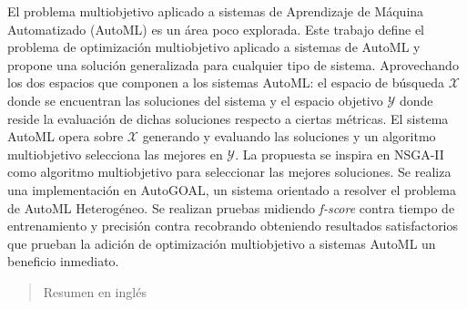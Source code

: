 \begin{resumen}
	El problema multiobjetivo aplicado a sistemas de Aprendizaje de M\'aquina Automatizado (AutoML) es un \'area poco explorada. Este trabajo define el problema de optimizaci\'on multiobjetivo aplicado a sistemas de AutoML y propone una soluci\'on generalizada para cualquier tipo de sistema.
    Aprovechando los dos espacios que componen a los sistemas AutoML: el espacio de b\'usqueda $\mathcal{X}$ donde se encuentran las soluciones del sistema y el espacio objetivo $\mathcal{Y}$ donde reside la evaluaci\'on de dichas soluciones respecto a ciertas m\'etricas. El sistema AutoML opera sobre $\mathcal{X}$ generando y evaluando las soluciones  y un algoritmo multiobjetivo selecciona las mejores en $\mathcal{Y}$.
    La propuesta se inspira en NSGA-II como algoritmo multiobjetivo para seleccionar las mejores soluciones. 
    Se realiza una implementaci\'on en AutoGOAL, un sistema orientado a resolver el problema de AutoML Heterog\'eneo. Se realizan pruebas midiendo \textit{f-score} contra tiempo de entrenamiento y precisi\'on contra recobrando obteniendo resultados satisfactorios que prueban la adici\'on de optimizaci\'on multiobjetivo a sistemas AutoML un beneficio inmediato.
\end{resumen}

\begin{abstract}
	Resumen en inglés
\end{abstract}
